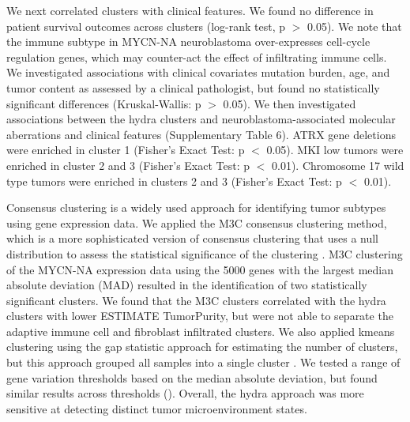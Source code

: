 \documentclass[10pt,letterpaper]{article}
\begin{document}
We next correlated clusters with clinical features. We found no difference in patient survival outcomes across clusters (log-rank test, p $>$ 0.05). We note that the immune subtype in MYCN-NA neuroblastoma over-expresses cell-cycle regulation genes, which may counter-act the effect of infiltrating immune cells. We investigated associations with clinical covariates mutation burden, age, and tumor content as assessed by a clinical pathologist, but found no statistically significant differences (Kruskal-Wallis: p $>$ 0.05). We then investigated associations between the hydra clusters and neuroblastoma-associated molecular aberrations and clinical features (Supplementary Table 6). ATRX gene deletions were enriched in cluster 1 (Fisher’s Exact Test: p $<$ 0.05). MKI low tumors were enriched in cluster 2 and 3 (Fisher’s Exact Test: p $<$ 0.01). Chromosome 17 wild type tumors were enriched in clusters 2 and 3 (Fisher’s Exact Test: p $<$ 0.01).

Consensus clustering is a widely used approach for identifying tumor subtypes using gene expression data. We applied the M3C consensus clustering method, which is a more sophisticated version of consensus clustering that uses a null distribution to assess the statistical significance of the clustering \cite{johnM3CMonteCarlo2018, wilkersonConsensusClusterPlusClassDiscovery2010}. M3C clustering of the MYCN-NA expression data using the 5000 genes with the largest median absolute deviation (MAD) resulted in the identification of two statistically significant clusters. We found that the M3C clusters correlated with the hydra clusters with lower ESTIMATE TumorPurity, but were not able to separate the adaptive immune cell and fibroblast infiltrated clusters. We also applied kmeans clustering using the gap statistic approach for estimating the number of clusters, but this approach grouped all samples into a single cluster \cite{tibshirani2001estimating,maechler2012cluster}. We tested a range of gene variation thresholds based on the median absolute deviation, but found similar results across thresholds (). Overall, the hydra approach was more sensitive at detecting distinct tumor microenvironment states.
\end{document}
